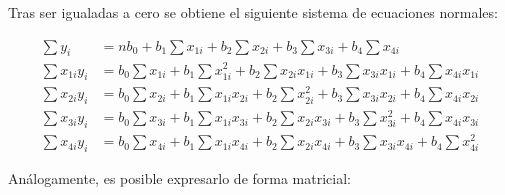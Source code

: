 \documentclass[spanish,12pt,a4paper]{article}
\begin{document}
\begin{enumerate}[label=\alph*)]
		Tras ser igualadas a cero se obtiene el siguiente sistema de ecuaciones normales:
		
		\begin{align*}
			\sum y_i &= n b_0 + b_1 \sum x_{1i} + b_2 \sum x_{2i} + b_3 \sum x_{3i} + b_4 \sum x_{4i} \\
			\sum x_{1i} y_i &= b_0 \sum x_{1i} + b_1 \sum x^2_{1i} + b_2 \sum x_{2i} x_{1i} + b_3 \sum x_{3i} x_{1i} + b_4 \sum x_{4i} x_{1i} \\
			\sum x_{2i} y_i &= b_0 \sum x_{2i} + b_1 \sum x_{1i} x_{2i} + b_2 \sum x^2_{2i} + b_3 \sum x_{3i} x_{2i} + b_4 \sum x_{4i} x_{2i} \\
			\sum x_{3i} y_i &= b_0 \sum x_{3i} + b_1 \sum x_{1i} x_{3i} + b_2 \sum x_{2i} x_{3i} + b_3 \sum x^2_{3i} + b_4 \sum x_{4i} x_{3i} \\
			\sum x_{4i} y_i &= b_0 \sum x_{4i} + b_1 \sum x_{1i} x_{4i} + b_2 \sum x_{2i} x_{4i} + b_3 \sum x_{3i} x_{4i} + b_4 \sum x^2_{4i}
		\end{align*}
		
		Análogamente, es posible expresarlo de forma matricial:
		
		

\end{enumerate}
\end{document}
